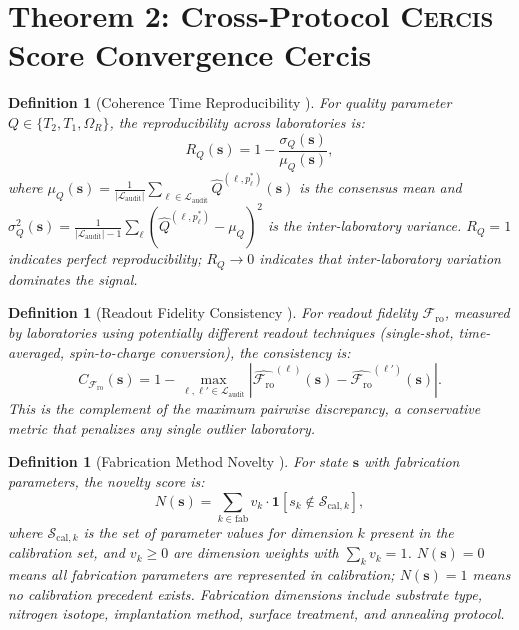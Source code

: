 \documentclass[11pt,a4paper]{article}
\newtheorem{definition}[theorem]{Definition}
\theoremstyle{definition}
\newcommand{\Cercis}{\textsc{Cercis}}
\newcommand{\ind}[1]{\mathbf{1}[#1]}
\newcommand{\cL}{\mathcal{L}}
\newcommand{\cS}{\mathcal{S}}
\newcommand{\Ttwo}{T_2}
\newcommand{\Tone}{T_1}
\newcommand{\RabiFreq}{\Omega_R}
\newcommand{\FidReadout}{\mathcal{F}_{\text{ro}}}
\begin{document}
\section{Theorem 2: Cross-Protocol \Cercis{} Score Convergence Cercis}
\label{sec:thm2}

\begin{definition}[Coherence Time Reproducibility ]
\label{def:coherence_repro}
For quality parameter $Q \in \{\Ttwo, \Tone, \RabiFreq\}$, the reproducibility
across laboratories is:
\begin{equation}
    R_Q(\mathbf{s}) = 1 - \frac{\sigma_Q(\mathbf{s})}{\mu_Q(\mathbf{s})},
\end{equation}
where $\mu_Q(\mathbf{s}) = \frac{1}{|\cL_{\text{audit}}|} \sum_{\ell \in \cL_{\text{audit}}} \widehat{Q}^{(\ell, p^*_\ell)}(\mathbf{s})$
is the consensus mean and $\sigma_Q^2(\mathbf{s}) = \frac{1}{|\cL_{\text{audit}}|-1} \sum_{\ell} (\widehat{Q}^{(\ell, p^*_\ell)} - \mu_Q)^2$
is the inter-laboratory variance. $R_Q = 1$ indicates perfect reproducibility;
$R_Q \to 0$ indicates that inter-laboratory variation dominates the signal.
\end{definition}

\begin{definition}[Readout Fidelity Consistency ]
\label{def:readout_consistency}
For readout fidelity $\FidReadout$, measured by laboratories using potentially
different readout techniques (single-shot, time-averaged, spin-to-charge
conversion), the consistency is:
\begin{equation}
    C_{\FidReadout}(\mathbf{s}) = 1 - \max_{\ell, \ell' \in \cL_{\text{audit}}} |\widehat{\FidReadout}^{(\ell)}(\mathbf{s}) - \widehat{\FidReadout}^{(\ell')}(\mathbf{s})|.
\end{equation}
This is the complement of the maximum pairwise discrepancy, a conservative
metric that penalizes any single outlier laboratory.
\end{definition}

\begin{definition}[Fabrication Method Novelty ]
\label{def:fab_novelty}
For state $\mathbf{s}$ with fabrication parameters, the novelty score is:
\begin{equation}
    N(\mathbf{s}) = \sum_{k \in \text{fab}} v_k \cdot \ind{s_k \notin \cS_{\text{cal}, k}},
    \label{eq:novelty}
\end{equation}
where $\cS_{\text{cal}, k}$ is the set of parameter values for dimension $k$
present in the calibration set, and $v_k \geq 0$ are dimension weights
with $\sum_k v_k = 1$. $N(\mathbf{s}) = 0$ means all fabrication parameters
are represented in calibration; $N(\mathbf{s}) = 1$ means no calibration
precedent exists. Fabrication dimensions include substrate type, nitrogen
isotope, implantation method, surface treatment, and annealing protocol.
\end{definition}
\end{document}
